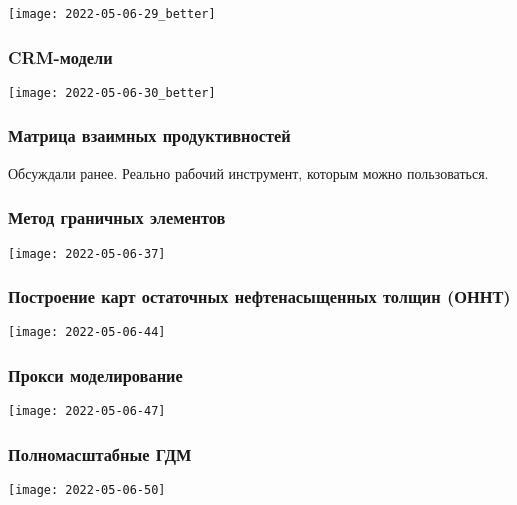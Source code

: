 \documentclass[main.tex]{subfiles}
\begin{document}
\texttt{[image: 2022-05-06-29\_better]}

\subsubsection{CRM-модели}

\texttt{[image: 2022-05-06-30\_better]}







\subsubsection{Матрица взаимных продуктивностей}

Обсуждали ранее. Реально рабочий инструмент, которым можно пользоваться.

\subsubsection{Метод граничных элементов}

\texttt{[image: 2022-05-06-37]}







\subsubsection{Построение карт остаточных нефтенасыщенных толщин (ОННТ)}

\texttt{[image: 2022-05-06-44]}



\subsubsection{Прокси моделирование}

\texttt{[image: 2022-05-06-47]}



\subsubsection{Полномасштабные ГДМ}

\texttt{[image: 2022-05-06-50]}

\end{document}
